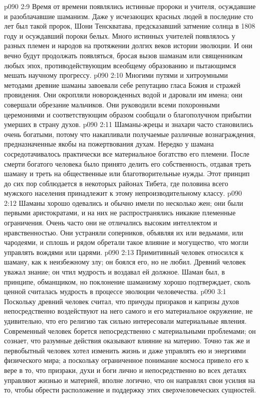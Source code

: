 \vs p090 2:9 Время от времени появлялись истинные пророки и учителя, осуждавшие и разоблачавшие шаманизм. Даже у исчезающих красных людей в последние сто лет был такой пророк, Шони Тенскватава, предсказавший затмение солнца в 1808 году и осуждавший пороки белых. Много истинных учителей появлялось у разных племен и народов на протяжении долгих веков истории эволюции. И они вечно будут продолжать появляться, бросая вызов шаманам или священникам любых эпох, противодействующим всеобщему образованию и пытающимся мешать научному прогрессу.
\vs p090 2:10 Многими путями и хитроумными методами древние шаманы завоевали себе репутацию гласа Божия и стражей провидения. Они окропляли новорожденных водой и даровали им имена; они совершали обрезание мальчиков. Они руководили всеми похоронными церемониями и соответствующим образом сообщали о благополучном прибытии умерших в страну духов.
\vs p090 2:11 Шаманы\hyp{}жрецы и знахари часто становились очень богатыми, потому что накапливали получаемые различные вознаграждения, предназначенные якобы на пожертвования духам. Нередко у шамана сосредотачивалось практически все материальное богатство его племени. После смерти богатого человека было принято делить его собственность, отдавая треть шаману и треть на общественные или благотворительные нужды. Этот принцип до сих пор соблюдается в некоторых районах Тибета, где половина всего мужского населения принадлежит к этому непроизводительному классу.
\vs p090 2:12 Шаманы хорошо одевались и обычно имели по несколько жен; они были первыми аристократами, и на них не распространялись никакие племенные ограничения. Очень часто они не отличались высоким интеллектом и нравственностью. Они устраняли соперников, объявляя их или ведьмами, или чародеями, и сплошь и рядом обретали такое влияние и могущество, что могли управлять вождями или царями.
\vs p090 2:13 Примитивный человек относился к шаману, как к неизбежному злу; он боялся его, но не любил. Древний человек уважал знание; он чтил мудрость и воздавал ей должное. Шаман был, в принципе, обманщиком, но поклонение шаманизму хорошо подтверждает, сколь ценной считалась мудрость в процессе эволюции человечества.
\vs p090 3:1 Поскольку древний человек считал, что причуды призраков и капризы духов непосредственно воздействуют на него самого и его материальное окружение, не удивительно, что его религию так сильно интересовали материальные явления. Современный человек борется непосредственно с материальными проблемами; он сознает, что разумные действия оказывают влияние на материю. Точно так же и первобытный человек хотел изменить жизнь и даже управлять ею и энергиями физического мира; а поскольку ограниченное понимание космоса привело его к вере в то, что призраки, духи и боги лично и непосредственно во всех деталях управляют жизнью и материей, вполне логично, что он направлял свои усилия на то, чтобы обрести расположение и поддержку этих сверхчеловеческих сущностей.
